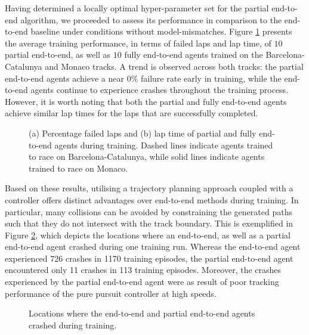 Having determined a locally optimal hyper-parameter set for the partial end-to-end algorithm, we proceeded to assess its performance in comparison to the end-to-end baseline under conditions without model-mismatches. 
Figure \ref{fig:all_tracks_train} presents the average training performance, in terms of failed laps and lap time, of $10$ partial end-to-end, as well as $10$ fully end-to-end agents trained on the Barcelona-Catalunya and Monaco tracks. 
A trend is observed across both tracks: the partial end-to-end agents achieve a near $0\%$ failure rate early in training, while the end-to-end agents continue to experience crashes throughout the training process.
However, it is worth noting that both the partial and fully end-to-end agents achieve similar lap times for the laps that are successfully completed. 

\begin{figure}[htb!]
    \centering
    
    \caption[Learning curves of partial and fully end-to-end agents trained to race on the Porto and Monaco tracks]{(a) Percentage failed laps and (b) lap time of partial and fully end-to-end agents during training. Dashed lines indicate agents trained to race on Barcelona-Catalunya, while solid lines indicate agents trained to race on Monaco.}
    \label{fig:all_tracks_train}
\end{figure}

Based on these results, utilising a trajectory planning approach coupled with a controller offers distinct advantages over end-to-end methods during training.
In particular, many collisions can be avoided by constraining the generated paths such that they do not intersect with the track boundary. 
This is exemplified in Figure \ref{fig:esp_crashes}, which depicts the locations where an end-to-end, as well as a partial end-to-end agent crashed during one training run.
Whereas the end-to-end agent experienced 726 crashes in 1170 training episodes, the partial end-to-end agent encountered only 11 crashes in 113 training episodes.
Moreover, the crashes experienced by the partial end-to-end agent were as result of poor tracking performance of the pure pursuit controller at high speeds.

\begin{figure}[htb!]
    \centering
    
    \caption{Locations where the end-to-end and partial end-to-end agents crashed during training.}
    \label{fig:esp_crashes}
\end{figure}


